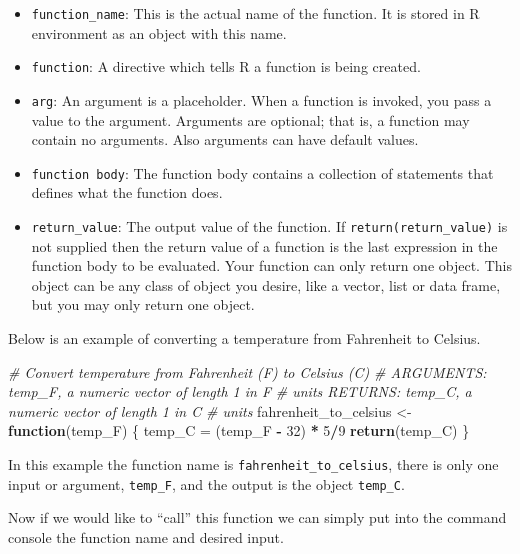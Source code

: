 \documentclass[
]{book}
\newenvironment{Shaded}{\begin{snugshade}}{\end{snugshade}}
\newcommand{\CommentTok}[1]{\textcolor[rgb]{0.56,0.35,0.01}{\textit{#1}}}
\newcommand{\ControlFlowTok}[1]{\textcolor[rgb]{0.13,0.29,0.53}{\textbf{#1}}}
\newcommand{\DecValTok}[1]{\textcolor[rgb]{0.00,0.00,0.81}{#1}}
\newcommand{\KeywordTok}[1]{\textcolor[rgb]{0.13,0.29,0.53}{\textbf{#1}}}
\newcommand{\NormalTok}[1]{#1}
\newcommand{\OperatorTok}[1]{\textcolor[rgb]{0.81,0.36,0.00}{\textbf{#1}}}
\newcommand{\StringTok}[1]{\textcolor[rgb]{0.31,0.60,0.02}{#1}}
\providecommand{\tightlist}{%
  \setlength{\itemsep}{0pt}\setlength{\parskip}{0pt}}
\begin{document}
\begin{itemize}
\tightlist
\item
  \texttt{function\_name}: This is the actual name of the function. It is stored in R environment as an object with this name.
\item
  \texttt{function}: A directive which tells R a function is being created.
\item
  \texttt{arg}: An argument is a placeholder. When a function is invoked, you pass a value to the argument. Arguments are optional; that is, a function may contain no arguments. Also arguments can have default values.
\item
  \texttt{function\ body}: The function body contains a collection of statements that defines what the function does.
\item
  \texttt{return\_value}: The output value of the function. If \texttt{return(return\_value)} is not supplied then the return value of a function is the last expression in the function body to be evaluated. Your function can only return one object. This object can be any class of object you desire, like a vector, list or data frame, but you may only return one object.
\end{itemize}

Below is an example of converting a temperature from Fahrenheit to Celsius.

\begin{Shaded}
\begin{Highlighting}[]
\CommentTok{# Convert temperature from Fahrenheit (F) to Celsius (C)}
\CommentTok{# ARGUMENTS: temp_F, a numeric vector of length 1 in F}
\CommentTok{# units RETURNS: temp_C, a numeric vector of length 1 in C}
\CommentTok{# units}
\NormalTok{fahrenheit_to_celsius <-}\StringTok{ }\ControlFlowTok{function}\NormalTok{(temp_F) \{}
\NormalTok{    temp_C =}\StringTok{ }\NormalTok{(temp_F }\OperatorTok{-}\StringTok{ }\DecValTok{32}\NormalTok{) }\OperatorTok{*}\StringTok{ }\DecValTok{5}\OperatorTok{/}\DecValTok{9}
    \KeywordTok{return}\NormalTok{(temp_C)}
\NormalTok{\}}
\end{Highlighting}
\end{Shaded}

In this example the function name is \texttt{fahrenheit\_to\_celsius}, there is only one input or argument, \texttt{temp\_F}, and the output is the object \texttt{temp\_C}.

Now if we would like to ``call'' this function we can simply put into the command console the function name and desired input.
\end{document}
